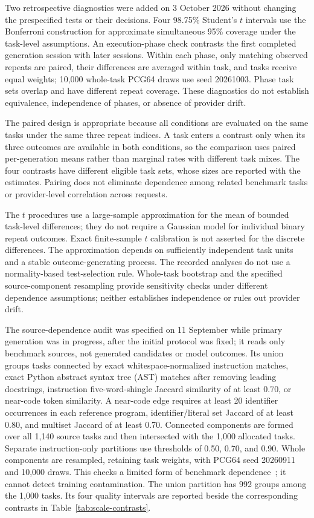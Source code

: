 Two retrospective diagnostics were added on 3 October 2026 without changing the prespecified tests or their decisions. Four 98.75\% Student's $t$ intervals use the Bonferroni construction for approximate simultaneous 95\% coverage under the task-level assumptions. An execution-phase check contrasts the first completed generation session with later sessions. Within each phase, only matching observed repeats are paired, their differences are averaged within task, and tasks receive equal weights; 10,000 whole-task PCG64 draws use seed 20261003. Phase task sets overlap and have different repeat coverage. These diagnostics do not establish equivalence, independence of phases, or absence of provider drift.

The paired design is appropriate because all conditions are evaluated on the same tasks under the same three repeat indices. A task enters a contrast only when its three outcomes are available in both conditions, so the comparison uses paired per-generation means rather than marginal rates with different task mixes. The four contrasts have different eligible task sets, whose sizes are reported with the estimates. Pairing does not eliminate dependence among related benchmark tasks or provider-level correlation across requests.

The $t$ procedures use a large-sample approximation for the mean of bounded task-level differences; they do not require a Gaussian model for individual binary repeat outcomes. Exact finite-sample $t$ calibration is not asserted for the discrete differences. The approximation depends on sufficiently independent task units and a stable outcome-generating process. The recorded analyses do not use a normality-based test-selection rule. Whole-task bootstrap and the specified source-component resampling provide sensitivity checks under different dependence assumptions; neither establishes independence or rules out provider drift.

The source-dependence audit was specified on 11 September while primary generation was in progress, after the initial protocol was fixed; it reads only benchmark sources, not generated candidates or model outcomes. Its union groups tasks connected by exact whitespace-normalized instruction matches, exact Python abstract syntax tree (AST) matches after removing leading docstrings, instruction five-word-shingle Jaccard similarity of at least 0.70, or near-code token similarity. A near-code edge requires at least 20 identifier occurrences in each reference program, identifier/literal set Jaccard of at least 0.80, and multiset Jaccard of at least 0.70. Connected components are formed over all 1,140 source tasks and then intersected with the 1,000 allocated tasks. Separate instruction-only partitions use thresholds of 0.50, 0.70, and 0.90. Whole components are resampled, retaining task weights, with PCG64 seed 20260911 and 10,000 draws. This checks a limited form of benchmark dependence~\cite{allamanis2019duplication,mackinnon2023clusters}; it cannot detect training contamination. The union partition has 992 groups among the 1,000 tasks. Its four quality intervals are reported beside the corresponding contrasts in Table~\ref{tab:scale-contrasts}.

